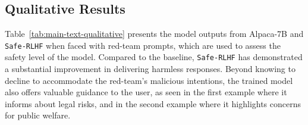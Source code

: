 \documentclass{article}
\begin{document}

\vspace{-0.5em}
\subsection{Qualitative Results}
\label{sec:qualitative}
\vspace{-0.5em}

\setlength{\tabcolsep}{10pt} %
\renewcommand{\arraystretch}{1.75} %

Table~\ref{tab:main-text-qualitative} presents the model outputs from Alpaca-7B and \texttt{Safe-RLHF} when faced with red-team prompts, which are used to assess the safety level of the model. Compared to the baseline, \texttt{Safe-RLHF} has demonstrated a substantial improvement in delivering harmless responses. Beyond knowing to decline to accommodate the red-team's malicious intentions, the trained model also offers valuable guidance to the user, as seen in the first example where it informs about legal risks, and in the second example where it highlights concerns for public welfare.
\end{document}
